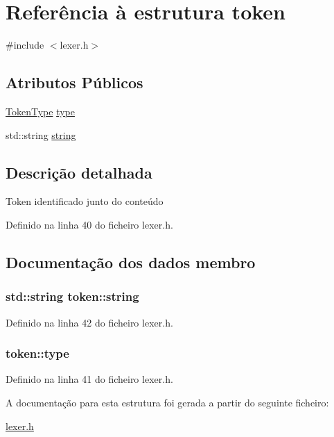 \hypertarget{structtoken}{\section{Referência à estrutura token}
\label{structtoken}
}


{\ttfamily \#include $<$lexer.\-h$>$}

\subsection*{Atributos Públicos}
\begin{DoxyCompactItemize}
\item 
\hyperlink{lexer_8h_aa520fbf142ba1e7e659590c07da31921}{Token\-Type} \hyperlink{structtoken_a0ccfb094c0dce37e1bae7d990c06cc92}{type}
\item 
std\-::string \hyperlink{structtoken_a2150b4d92215b15d0c62c40cafd407ba}{string}
\end{DoxyCompactItemize}


\subsection{Descrição detalhada}
Token identificado junto do conteúdo 

Definido na linha 40 do ficheiro lexer.\-h.



\subsection{Documentação dos dados membro}
\hypertarget{structtoken_a2150b4d92215b15d0c62c40cafd407ba}{
\subsubsection[{string}]{\setlength{\rightskip}{0pt plus 5cm}std\-::string token\-::string}}\label{structtoken_a2150b4d92215b15d0c62c40cafd407ba}


Definido na linha 42 do ficheiro lexer.\-h.

\hypertarget{structtoken_a0ccfb094c0dce37e1bae7d990c06cc92}{
\subsubsection[{type}]{ token\-::type}}\label{structtoken_a0ccfb094c0dce37e1bae7d990c06cc92}


Definido na linha 41 do ficheiro lexer.\-h.



A documentação para esta estrutura foi gerada a partir do seguinte ficheiro\-:\begin{DoxyCompactItemize}
\item 
\hyperlink{lexer_8h}{lexer.\-h}\end{DoxyCompactItemize}
